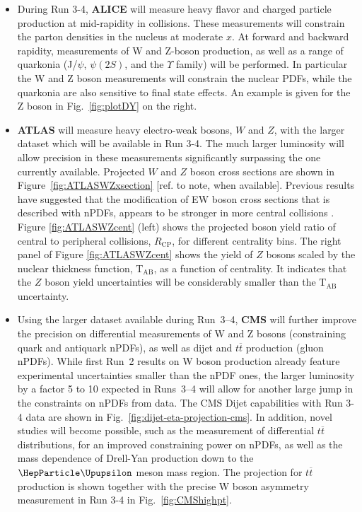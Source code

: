 \documentclass[../report.tex]{subfiles}
\begin{document}
\begin{itemize}
\item During Run 3-4, \textbf{ALICE} will measure heavy flavor and charged particle production at mid-rapidity in \pPb collisions. These measurements will constrain the parton densities in the nucleus at moderate $x$. At forward and backward rapidity, measurements of W and Z-boson production, as well as a range of quarkonia (J/$\psi$, $\psi(2S)$, and the $\Upsilon$ family) will be performed. In particular the W and Z boson measurements will constrain the nuclear PDFs, while the quarkonia are also sensitive to final state effects. An example is given for the Z boson in Fig.~\ref{fig:plotDY} on the right. 
\item \textbf{ATLAS} will measure heavy electro-weak bosons, $W$ and $Z$, with the larger \pPb dataset which will be available in Run 3-4.  The much larger luminosity will allow precision in these measurements significantly surpassing the one currently available.  Projected $W$ and $Z$ boson cross sections are shown in Figure~\ref{fig:ATLASWZxsection} [ref. to note, when available].  Previous results have suggested that the modification of EW boson cross sections that is described with nPDFs, appears to be stronger in more central collisions \cite{Aad:2015gta,TheATLAScollaboration:2015lnm}.  Figure \ref{fig:ATLASWZcent} (left) shows the projected boson yield ratio of central to peripheral collisions, $R_{\mathrm{CP}}$, for different centrality bins.  The right panel of Figure \ref{fig:ATLASWZcent} shows the yield of $Z$ bosons scaled by the nuclear thickness function, T$_{\mathrm{AB}}$,  as a function of centrality. It indicates that the $Z$ boson yield uncertainties will be considerably smaller than the T$_{\mathrm{AB}}$ uncertainty. 
\item  Using the larger \pPb dataset available during Run~3--4, \textbf{CMS} will further improve the precision on differential measurements of W and Z bosons (constraining quark and antiquark nPDFs), as well as dijet and $t\overline{t}$ production (gluon nPDFs). While first Run~2 results on W boson production already feature experimental uncertainties smaller than the nPDF ones, the larger luminosity by a factor 5 to 10 expected in Runs~3--4 will allow for another large jump in the constraints on nPDFs from data. The CMS Dijet capabilities with Run 3-4 data are shown in Fig.~\ref{fig:dijet-eta-projection-cms}. In addition, novel studies will become possible, such as the measurement of differential $t\overline{t}$ distributions, for an improved constraining power on nPDFs, as well as the mass dependence of Drell-Yan production down to the $\PGU$ meson mass region. The projection for $t\overline{t}$ production is shown together with the precise W boson asymmetry measurement in Run 3-4 in Fig.~\ref{fig:CMShighpt}.

\end{itemize}
\end{document}
